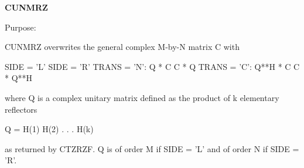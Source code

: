 {\bfseries C\+U\+N\+M\+R\+Z} 

 \begin{DoxyParagraph}{Purpose\+: }
\begin{DoxyVerb} CUNMRZ overwrites the general complex M-by-N matrix C with

                 SIDE = 'L'     SIDE = 'R'
 TRANS = 'N':      Q * C          C * Q
 TRANS = 'C':      Q**H * C       C * Q**H

 where Q is a complex unitary matrix defined as the product of k
 elementary reflectors

       Q = H(1) H(2) . . . H(k)

 as returned by CTZRZF. Q is of order M if SIDE = 'L' and of order N
 if SIDE = 'R'.\end{DoxyVerb}
 
\end{DoxyParagraph}

